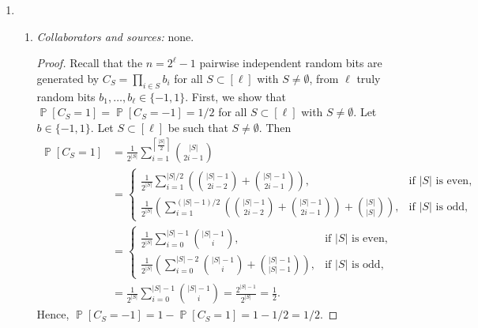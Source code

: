 \documentclass[letterpaper, reqno,11pt]{article}
\newcommand{\PP}{\mathop{{}\mathbb{P}}}
\begin{document}
\begin{enumerate}
  \item \begin{enumerate}
    \item \noindent\emph{Collaborators and sources:} none.

    \bigskip

    \begin{proof}
      Recall that the $n = 2^\ell - 1$ pairwise independent random bits are generated by $C_S = \prod_{i \in S} b_i$ for all $S \subset [\ell]$ with $S \neq \emptyset$, from $\ell$ truly random bits $b_1, \ldots, b_\ell \in \{ -1, 1 \}$. First, we show that $\PP[C_S = 1] = \PP[C_S = -1] = 1/2$ for all $S \subset [\ell]$ with $S \neq \emptyset$. Let $b \in \{ -1, 1 \}$. Let $S \subset [\ell]$ be such that $S \neq \emptyset$. Then
      \begin{align*}
        \PP\left[C_S = 1\right] &= \frac{1}{2^{|S|}} \sum_{i = 1}^{\left\lceil \frac{|S|}{2} \right\rceil} \binom{|S|}{2i - 1} \\
        &= \left\{
          \begin{array}{ll}
            \frac{1}{2^{|S|}} \sum_{i = 1}^{|S|/2} \left(\binom{|S| - 1}{2i - 2} + \binom{|S| - 1}{2i - 1}\right), & \text{if $|S|$ is even}, \\
            \frac{1}{2^{|S|}} \left(\sum_{i = 1}^{(|S| - 1)/2} \left(\binom{|S| - 1}{2i - 2} + \binom{|S| - 1}{2i - 1}\right) + \binom{|S|}{|S|}\right), & \text{if $|S|$ is odd},
          \end{array}
        \right. \\
        &= \left\{
          \begin{array}{ll}
            \frac{1}{2^{|S|}} \sum_{i = 0}^{|S| - 1} \binom{|S| - 1}{i}, & \text{if $|S|$ is even}, \\
            \frac{1}{2^{|S|}} \left(\sum_{i = 0}^{|S| - 2} \binom{|S| - 1}{i} + \binom{|S| - 1}{|S| - 1}\right), & \text{if $|S|$ is odd},
          \end{array}
        \right. \\
        &= \frac{1}{2^{|S|}} \sum_{i = 0}^{|S| - 1} \binom{|S| - 1}{i} = \frac{2^{|S| - 1}}{2^{|S|}} = \frac{1}{2}.
      \end{align*}
      Hence, $\PP[C_S = -1] = 1 - \PP[C_S = 1] = 1 - 1/2 = 1/2$.


\end{proof}
\end{enumerate}
\end{enumerate}
\end{document}
